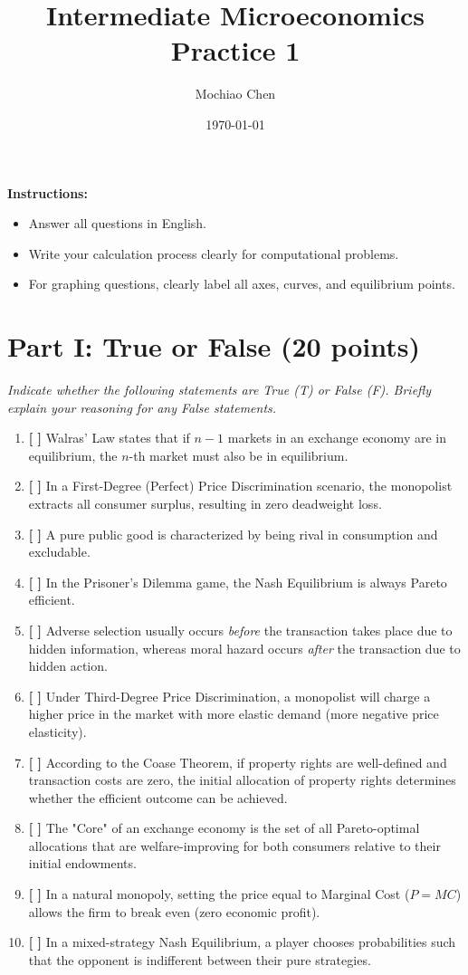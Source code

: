 \documentclass[12pt]{article}
\title{\textbf{Intermediate Microeconomics Practice 1}}
\author{Mochiao Chen}
\date{\today}
\begin{document}
\maketitle

\noindent \textbf{Instructions:}
\begin{itemize}
    \item Answer all questions in English.
    \item Write your calculation process clearly for computational problems.
    \item For graphing questions, clearly label all axes, curves, and equilibrium points.
\end{itemize}

\section*{Part I: True or False (20 points)}
\textit{Indicate whether the following statements are True (T) or False (F). Briefly explain your reasoning for any False statements.}

\begin{enumerate}
    \item \textbf{[ \quad ]} Walras' Law states that if $n-1$ markets in an exchange economy are in equilibrium, the $n$-th market must also be in equilibrium.
    \item \textbf{[ \quad ]} In a First-Degree (Perfect) Price Discrimination scenario, the monopolist extracts all consumer surplus, resulting in zero deadweight loss.
    \item \textbf{[ \quad ]} A pure public good is characterized by being rival in consumption and excludable.
    \item \textbf{[ \quad ]} In the Prisoner's Dilemma game, the Nash Equilibrium is always Pareto efficient.
    \item \textbf{[ \quad ]} Adverse selection usually occurs \textit{before} the transaction takes place due to hidden information, whereas moral hazard occurs \textit{after} the transaction due to hidden action.
    \item \textbf{[ \quad ]} Under Third-Degree Price Discrimination, a monopolist will charge a higher price in the market with more elastic demand (more negative price elasticity).
    \item \textbf{[ \quad ]} According to the Coase Theorem, if property rights are well-defined and transaction costs are zero, the initial allocation of property rights determines whether the efficient outcome can be achieved.
    \item \textbf{[ \quad ]} The "Core" of an exchange economy is the set of all Pareto-optimal allocations that are welfare-improving for both consumers relative to their initial endowments.
    \item \textbf{[ \quad ]} In a natural monopoly, setting the price equal to Marginal Cost ($P = MC$) allows the firm to break even (zero economic profit).
    \item \textbf{[ \quad ]} In a mixed-strategy Nash Equilibrium, a player chooses probabilities such that the opponent is indifferent between their pure strategies.
\end{enumerate}
\end{document}
